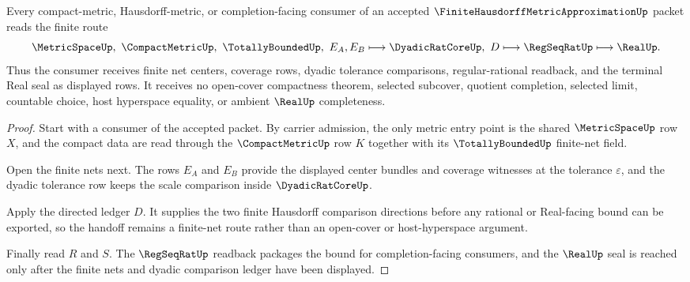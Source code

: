 \begin{theorem}
\label{thm:finite-hausdorff-metric-approximation-finite-net-handoff}
Every compact-metric, Hausdorff-metric, or completion-facing consumer of an accepted $\FiniteHausdorffMetricApproximationUp$ packet reads the finite route
$$
\MetricSpaceUp,\ \CompactMetricUp,\ \TotallyBoundedUp,\ E_A,E_B
\longmapsto
\DyadicRatCoreUp,\ D
\longmapsto
\RegSeqRatUp
\longmapsto
\RealUp .
$$
Thus the consumer receives finite net centers, coverage rows, dyadic tolerance comparisons, regular-rational readback, and the terminal Real seal as displayed rows. It receives no open-cover compactness theorem, selected subcover, quotient completion, selected limit, countable choice, host hyperspace equality, or ambient $\RealUp$ completeness.
\end{theorem}
\begin{proof}
Start with a consumer of the accepted packet. By carrier admission, the only metric entry point is the shared $\MetricSpaceUp$ row $X$, and the compact data are read through the $\CompactMetricUp$ row $K$ together with its $\TotallyBoundedUp$ finite-net field.

Open the finite nets next. The rows $E_A$ and $E_B$ provide the displayed center bundles and coverage witnesses at the tolerance $\varepsilon$, and the dyadic tolerance row keeps the scale comparison inside $\DyadicRatCoreUp$.

Apply the directed ledger $D$. It supplies the two finite Hausdorff comparison directions before any rational or Real-facing bound can be exported, so the handoff remains a finite-net route rather than an open-cover or host-hyperspace argument.

Finally read $R$ and $S$. The $\RegSeqRatUp$ readback packages the bound for completion-facing consumers, and the $\RealUp$ seal is reached only after the finite nets and dyadic comparison ledger have been displayed.
\end{proof}


